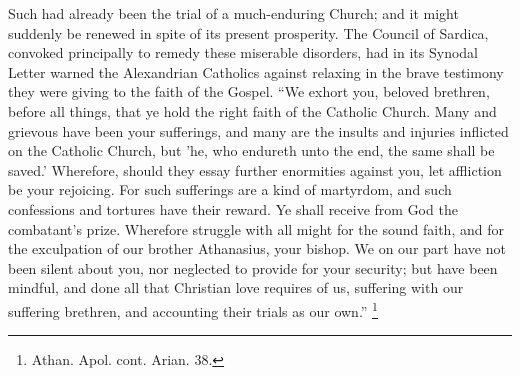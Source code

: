 Such had already been the trial of a much-enduring Church; and it
might suddenly be renewed in spite of its present prosperity. The
Council of Sardica, convoked principally to remedy these miserable
disorders, had in its Synodal Letter warned the Alexandrian Catholics
against relaxing in the brave testimony they were giving to the faith
of the Gospel. ``We exhort you, beloved brethren, before all
things, that ye hold the right faith of the Catholic Church. Many and
grievous have been your sufferings, and many are the insults and
injuries inflicted on the Catholic Church, but 'he, who endureth unto
the end, the same shall be saved.' Wherefore, should they essay
further enormities against you, let affliction be your rejoicing. For
such sufferings are a kind of martyrdom, and such confessions and
tortures have their reward. Ye shall receive from God the combatant's
prize. Wherefore struggle with all might for the sound faith, and for
the exculpation of our brother Athanasius, your bishop. We on our part
have not been silent about you, nor neglected to provide for your security;
but have been mindful, and done all that Christian love requires of
us, suffering with our suffering brethren, and accounting their trials
as our own.'' \footnote{Athan. Apol. cont. Arian. 38.}

